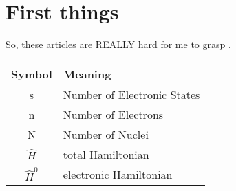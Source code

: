\section{First things}
So, these articles are REALLY hard for me to grasp \cite{nikodem2016quantum,mignolet2014charge,nikodem2016controlling}.

\vspace{2cm}

\begin{tabular}{|c|l|}
\hline
Symbol & Meaning\\
\hline
s & Number of Electronic States\\
n & Number of Electrons\\
N & Number of Nuclei\\
$\hat{H}$ & total Hamiltonian\\
$\hat{H}^0$ & electronic Hamiltonian\\
\hline
\end{tabular}

\vspace{2cm}